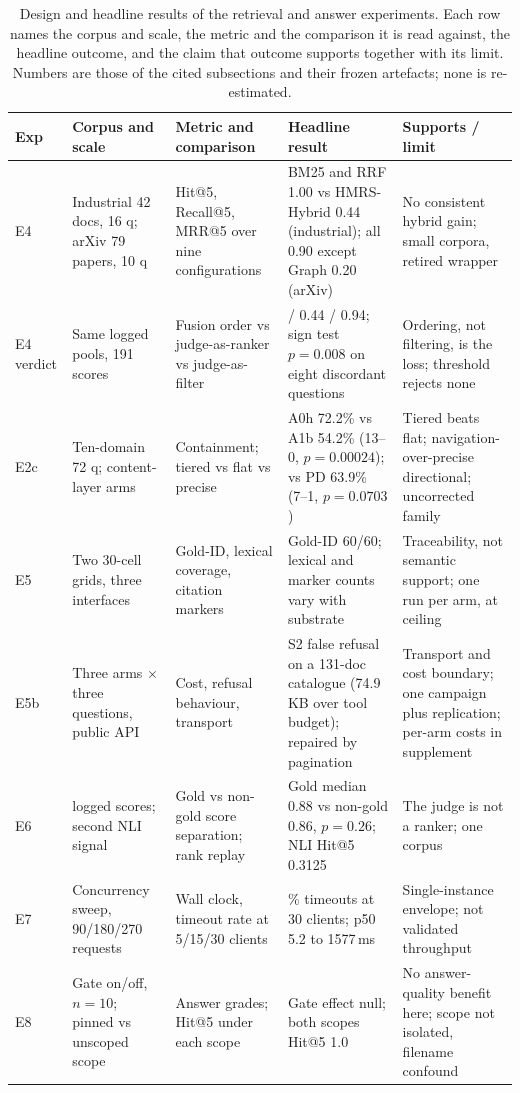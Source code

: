 \begin{table}[t]
\centering
\footnotesize
\setlength{\tabcolsep}{4pt}
\caption{Design and headline results of the retrieval and answer experiments.
Each row names the corpus and scale, the metric and the comparison it is read
against, the headline outcome, and the claim that outcome supports together
with its limit. Numbers are those of the cited subsections and their frozen
artefacts; none is re-estimated.}
\label{tab:retrieval-design}
\begin{tabular}{@{}>{\raggedright\arraybackslash}p{}>{\raggedright\arraybackslash}p{}>{\raggedright\arraybackslash}p{}>{\raggedright\arraybackslash}p{}>{\raggedright\arraybackslash}p{}@{}}
\toprule
Exp & Corpus and scale & Metric and comparison & Headline result & Supports / limit\\
\midrule
E4 & Industrial 42 docs, 16 q; arXiv 79 papers, 10 q & Hit@5, Recall@5, MRR@5 over nine configurations & BM25 and RRF 1.00 vs HMRS-Hybrid 0.44 (industrial); all 0.90 except Graph 0.20 (arXiv) & No consistent hybrid gain; small corpora, retired wrapper\\
E4 verdict & Same logged pools, 191 scores & Fusion order vs judge-as-ranker vs judge-as-filter & 0.94 / 0.44 / 0.94; sign test $p=0.008$ on eight discordant questions & Ordering, not filtering, is the loss; threshold rejects none\\
E2c & Ten-domain 72 q; content-layer arms & Containment; tiered vs flat vs precise & A0h 72.2\% vs A1b 54.2\% (13--0, $p=0.00024$); vs PD 63.9\% (7--1, $p=0.0703$) & Tiered beats flat; navigation-over-precise directional; uncorrected family\\
E5 & Two 30-cell grids, three interfaces & Gold-ID, lexical coverage, citation markers & Gold-ID 60/60; lexical and marker counts vary with substrate & Traceability, not semantic support; one run per arm, at ceiling\\
E5b & Three arms $\times$ three questions, public API & Cost, refusal behaviour, transport & S2 false refusal on a 131-doc catalogue (74.9\,KB over tool budget); repaired by pagination & Transport and cost boundary; one campaign plus replication; per-arm costs in supplement\\
E6 & 191 logged scores; second NLI signal & Gold vs non-gold score separation; rank replay & Gold median 0.88 vs non-gold 0.86, $p=0.26$; NLI Hit@5 0.3125 & The judge is not a ranker; one corpus\\
E7 & Concurrency sweep, 90/180/270 requests & Wall clock, timeout rate at 5/15/30 clients & 41\% timeouts at 30 clients; p50 5.2 to 1577\,ms & Single-instance envelope; not validated throughput\\
E8 & Gate on/off, $n=10$; pinned vs unscoped scope & Answer grades; Hit@5 under each scope & Gate effect null; both scopes Hit@5 1.0 & No answer-quality benefit here; scope not isolated, filename confound\\
\bottomrule
\end{tabular}
\end{table}


